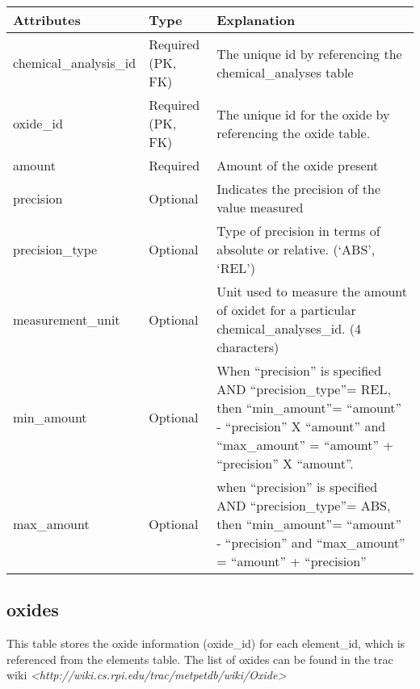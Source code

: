 \documentclass[letterpaper,10pt,english]{sphinxmanual}
\begin{document}
\begin{tabulary}{\linewidth}{|L|L|L|}
\hline
\textbf{
Attributes
} & \textbf{
Type
} & \textbf{
Explanation
}\\\hline

chemical\_analysis\_id
 & 
Required (PK, FK)
 & 
The unique id by referencing the chemical\_analyses table
\\\hline

oxide\_id
 & 
Required (PK, FK)
 & 
The unique id for the oxide by referencing the oxide table.
\\\hline

amount
 & 
Required
 & 
Amount of the oxide present
\\\hline

precision
 & 
Optional
 & 
Indicates the precision of the value measured
\\\hline

precision\_type
 & 
Optional
 & 
Type of precision in terms of absolute or relative. (‘ABS’, ‘REL’)
\\\hline

measurement\_unit
 & 
Optional
 & 
Unit used to measure the amount of oxidet for a particular
chemical\_analyses\_id. (4 characters)
\\\hline

min\_amount
 & 
Optional
 & 
When ``precision'' is specified AND ``precision\_type''= REL, then
``min\_amount''= ``amount'' - ``precision'' X ``amount'' and
``max\_amount'' = ``amount'' + ``precision'' X ``amount''.
\\\hline

max\_amount
 & 
Optional
 & 
when ``precision'' is specified AND ``precision\_type''= ABS, then
``min\_amount''= ``amount'' - ``precision''  and
``max\_amount'' = ``amount'' + ``precision''
\\\hline
\end{tabulary}



\subsection{oxides}
\label{Table_Description:oxides}
This table stores the oxide information (oxide\_id) for each element\_id, which is referenced from the elements table.
The list of oxides can be found in the trac wiki \emph{\textless{}http://wiki.cs.rpi.edu/trac/metpetdb/wiki/Oxide\textgreater{}}
\end{document}
